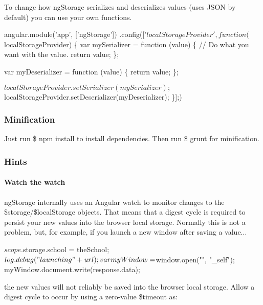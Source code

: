 To change how ng\+Storage serializes and deserializes values (uses J\+S\+ON by default) you can use your own functions.


\begin{DoxyCode}
angular.module('app', ['ngStorage'])
.config(['$localStorageProvider', 
  function ($localStorageProvider) \{
    var mySerializer = function (value) \{
      // Do what you want with the value.
      return value;
    \};

    var myDeserializer = function (value) \{
      return value;
    \};

    $localStorageProvider.setSerializer(mySerializer);
    $localStorageProvider.setDeserializer(myDeserializer);
  \}];)
\end{DoxyCode}


\subsubsection*{Minification}

Just run {\ttfamily \$ npm install} to install dependencies. Then run {\ttfamily \$ grunt} for minification.

\subsubsection*{Hints}

\paragraph*{Watch the watch}

ng\+Storage internally uses an Angular watch to monitor changes to the {\ttfamily \$storage}/{\ttfamily \$local\+Storage} objects. That means that a digest cycle is required to persist your new values into the browser local storage. Normally this is not a problem, but, for example, if you launch a new window after saving a value...


\begin{DoxyCode}
$scope.$storage.school = theSchool;
$log.debug("launching " + url);
var myWindow = $window.open("", "\_self");
myWindow.document.write(response.data);
\end{DoxyCode}


the new values will not reliably be saved into the browser local storage. Allow a digest cycle to occur by using a zero-\/value {\ttfamily \$timeout} as\+:




